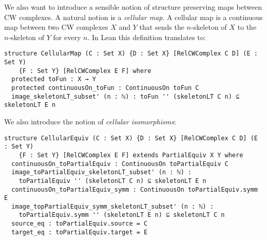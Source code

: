 We also want to introduce a sensible notion of structure preserving maps between CW complexes.
A natural notion is a \emph{cellular map}. 
A cellular map is a continuous map between two CW complexes $X$ and $Y$ that sends the $n$-skeleton of $X$ to the $n$-skeleton of $Y$ for every $n$.
In Lean this definition translates to: 

\begin{lstlisting}[frame=single]
structure CellularMap (C : Set X) {D : Set X} [RelCWComplex C D] (E : Set Y) 
    {F : Set Y} [RelCWComplex E F] where
  protected toFun : X → Y
  protected continuousOn_toFun : ContinuousOn toFun C
  image_skeletonLT_subset' (n : ℕ) : toFun '' (skeletonLT C n) ⊆ skeletonLT E n
\end{lstlisting}

We also introduce the notion of \emph{cellular isomorphisms}: 

\begin{lstlisting}[frame=single]
structure CellularEquiv (C : Set X) {D : Set X} [RelCWComplex C D] (E : Set Y) 
    {F : Set Y} [RelCWComplex E F] extends PartialEquiv X Y where
  continuousOn_toPartialEquiv : ContinuousOn toPartialEquiv C
  image_toPartialEquiv_skeletonLT_subset' (n : ℕ) :
    toPartialEquiv '' (skeletonLT C n) ⊆ skeletonLT E n
  continuousOn_toPartialEquiv_symm : ContinuousOn toPartialEquiv.symm E
  image_topPartialEquiv_symm_skeletonLT_subset' (n : ℕ) :
    toPartialEquiv.symm '' (skeletonLT E n) ⊆ skeletonLT C n
  source_eq : toPartialEquiv.source = C
  target_eq : toPartialEquiv.target = E
\end{lstlisting}

